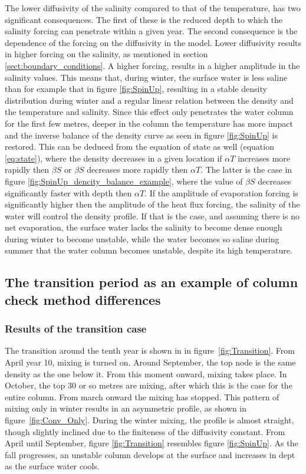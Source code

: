 \documentclass[twocolumn]{article}
\begin{document}
The lower diffusivity of the salinity compared to that of the temperature, has two significant consequences. The first of these is the reduced depth to which the salinity forcing can penetrate within a given year. The second consequence is the dependence of the forcing on the diffusivity in the model. Lower diffusivity results in higher forcing on the salinity, as mentioned in section \ref{sect:boundary_conditions}. A higher forcing, results in a higher amplitude in the salinity values. This means that, during winter, the surface water is less saline than for example that in figure \ref{fig:SpinUp}, resulting in a stable density distribution during winter and a regular linear relation between the density and the temperature and salinity. Since this effect only penetrates the water column for the first few metres, deeper in the column the temperature has more impact and the inverse balance of the density curve as seen in figure \ref{fig:SpinUp} is restored. This can be deduced from the equation of state as well (equation \ref{eq:state}), where the density decreases in a given location if $\alpha T$ increases more rapidly then $\beta S$ or $\beta S$ decreases more rapidly then $\alpha T$. The latter is the case in figure \ref{fig:SpinUp_dencity_balance_example}, where the value of $\beta S$ decreases significantly faster with depth then $\alpha T$. If the amplitude of evaporation forcing is significantly higher then the amplitude of the heat flux forcing, the salinity of the water will control the density profile. If that is the case, and assuming there is no net evaporation, the surface water lacks the salinity to become dense enough during winter to become unstable, while the water becomes so saline during summer that the water column becomes unstable, despite its high temperature.
 
\subsection{The transition period as an example of column check method differences}
\label{sect:transition}
\subsubsection{Results of the transition case}
The transition around the tenth year is shown in in figure~\ref{fig:Transition}. From April year 10, mixing is turned on. Around September, the top node is the same density as the one below it. From this moment onward, mixing takes place. In October, the top 30 or so metres are mixing, after which this is the case for the entire column. From march onward the mixing has stopped. This pattern of mixing only in winter results in an asymmetric profile, as shown in figure~\ref{fig:Conv_Only}. During the winter mixing, the profile is almost straight, though slightly inclined due to the finiteness of the diffusivity constant. From April until September, figure \ref{fig:Transition} resembles figure \ref{fig:SpinUp}. As the fall progresses, an unstable column develops at the surface and increases in dept as the surface water cools. 
\end{document}
